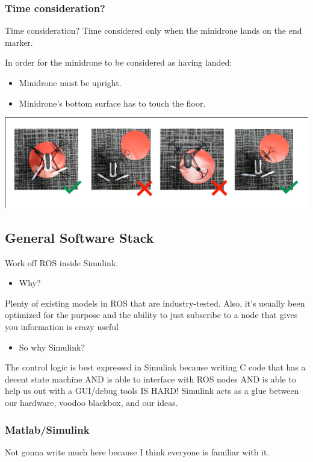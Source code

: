 \documentclass[unrestricted]{meetingnotesminutes}
\begin{document}
\subsubsection{Time consideration?}
\label{sec:orgd9eb607}
Time consideration?
Time considered only when the minidrone lands on the end marker.

In order for the minidrone to be considered as having landed:
\begin{itemize}
\item Minidrone must be upright.
\item Minidrone's bottom surface has to touch the floor.
\end{itemize}
\begin{center}
\includegraphics[width=.9\linewidth]{./images/screenshot-01.png}
\end{center}

\subsection{General Software Stack}
\label{sec:org7bbea01}
Work off ROS inside Simulink.

\begin{itemize}
\item Why?
\end{itemize}
Plenty of existing models in ROS that are industry-tested. Also, it's usually been optimized for the purpose and the ability to just subscribe to a node that gives you information is crazy useful

\begin{itemize}
\item So why Simulink?
\end{itemize}
The control logic is best expressed in Simulink because writing C code that has a decent state machine AND is able to interface with ROS nodes AND is able to help us out with a GUI/debug tools IS HARD! Simulink acts as a glue between our hardware, voodoo blackbox, and our ideas.

\subsubsection{Matlab/Simulink}
\label{sec:orgbed147f}
Not gonna write much here because I think everyone is familiar with it.
\end{document}
